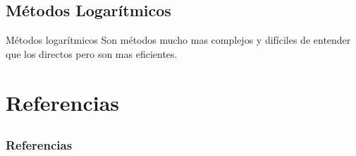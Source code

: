 \documentclass{beamer}
\begin{document}
\subsection{M\'etodos Logar\'itmicos}
\begin{frame}{M\'etodos logar\'itmicos}
	Son m\'etodos mucho mas complejos y dif\'iciles de entender que los directos pero son mas eficientes.
\end{frame}

\section{Referencias}
\subsection{}
\begin{frame}[allowframebreaks]
	
	\frametitle{Referencias}
	
	
\end{frame}
\end{document}
